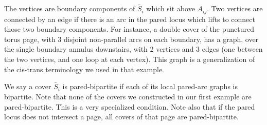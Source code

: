 \documentclass[12pt]{amsart}
\theoremstyle{definition}
\begin{document}
The vertices are boundary components of $\widetilde{S_i}$ which sit above
$A_{ij}$. Two
vertices are connected by an edge if there is an arc in the pared locus which
lifts to connect those two boundary components. For instance, a double cover of
the punctured torus page, with 3 disjoint non-parallel arcs on each boundary,
has a graph, over the single boundary annulus downstairs,  with 2 vertices and
3 edges (one between the two vertices, and one loop at each vertex). This graph
is a generalization of the cis-trans terminology we used in that example.

We say a cover $\widetilde{S_i}$ is pared-bipartite if each of its local pared-arc
graphs is bipartite. Note that none of the covers we constructed in our first
example are pared-bipartite. This is a very specialized condition. Note also
that if the pared locus does not intersect a page, all covers of that page are
pared-bipartite.
\end{document}

